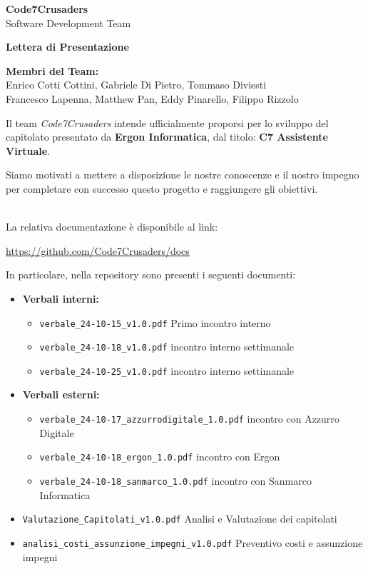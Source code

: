 \documentclass{article}
\begin{document}
\begin{titlepage}
    {\Huge \textbf{Code7Crusaders}}\\
    \vspace{0.5cm}
    {\Large Software Development Team}\\
    \vspace{2cm}
    
    {\large \textbf{Lettera di Presentazione}}\\
    \vspace{5cm}

    \textbf{Membri del Team:}\\
    Enrico Cotti Cottini, Gabriele Di Pietro, Tommaso Diviesti \\
    Francesco Lapenna, Matthew Pan, Eddy Pinarello, Filippo Rizzolo \\
    \vspace{0.5cm}
    
    \vspace{1cm}
\end{titlepage}


Il team \textit{Code7Crusaders} intende ufficialmente proporsi per lo sviluppo del capitolato presentato da \textbf{Ergon Informatica}, 
dal titolo: \textbf{C7 Assistente Virtuale}.

Siamo motivati a mettere a disposizione le nostre conoscenze e il nostro impegno 
per completare con successo questo progetto e raggiungere gli obiettivi.

\\
La relativa documentazione è disponibile al link:
\begin{center}
    \url{https://github.com/Code7Crusaders/docs}
\end{center}
In particolare, nella repository sono presenti i seguenti documenti:
\begin{itemize}
    \item \textbf{Verbali interni:}
    \begin{itemize}
        \item \texttt{verbale\_24-10-15\_v1.0.pdf} Primo incontro interno
        \item \texttt{verbale\_24-10-18\_v1.0.pdf} incontro interno settimanale
        \item \texttt{verbale\_24-10-25\_v1.0.pdf} incontro interno settimanale
    \end{itemize}
    \item \textbf{Verbali esterni:}
    \begin{itemize}
        \item \texttt{verbale\_24-10-17\_azzurrodigitale\_1.0.pdf} incontro con Azzurro Digitale
        \item \texttt{verbale\_24-10-18\_ergon\_1.0.pdf} incontro con Ergon
        \item \texttt{verbale\_24-10-18\_sanmarco\_1.0.pdf} incontro con Sanmarco Informatica
    \end{itemize}
    \item \texttt{Valutazione\_Capitolati\_v1.0.pdf} Analisi e Valutazione dei capitolati 
    \item \texttt{analisi\_costi\_assunzione\_impegni\_v1.0.pdf} Preventivo costi e assunzione impegni
\end{itemize}
\end{document}
